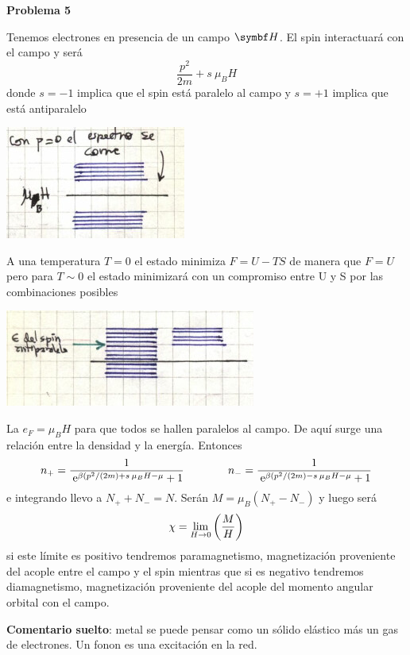 \documentclass[10pt,oneside]{CBFT_book}
\begin{document}
\begin{ejemplo}{\bf Problema 5}

Tenemos electrones en presencia de un campo $\vb{H}$. El spin interactuará con el campo y será
\[
	\frac{ p^2 }{ 2 m } + s \: \mu_B H
\]
donde $s=-1$ implica que el spin está paralelo al campo y $s=+1$ implica que está antiparalelo

\includegraphics[scale=0.5]{images/1606329613.jpg}

A una temperatura $T=0$ el estado minimiza $F=U-TS$ de manera que $F=U$ pero para $T\sim 0$ el 
estado minimizará con un compromiso entre U y S por las combinaciones posibles

\includegraphics[scale=0.5]{images/1606329617.jpg}

La $e_F = \mu_B H$ para que todos se hallen paralelos al campo. De aquí surge una relación entre
la densidad y la energía. Entonces
\[
	n_+ = \frac{ 1 }{ \:\mathrm{e}^{ \beta( p^2/(2m) + s \: \mu_B H - \mu } + 1 } \qquad \qquad 
	n_- = \frac{ 1 }{ \:\mathrm{e}^{ \beta( p^2/(2m) - s \: \mu_B H - \mu } + 1 }
\]
e integrando llevo a $N_+ + N_- = N$. Serán $M = \mu_B( N_+ - N_- ) $ y luego será
\[
	\chi = \lim_{H\to 0} \left( \frac{ M }{ H } \right)
\]
si este límite es positivo tendremos paramagnetismo, magnetización proveniente del acople entre
el campo y el spin mientras que si es negativo tendremos diamagnetismo, magnetización proveniente
del acople del momento angular orbital con el campo.

\end{ejemplo}

{\bf Comentario suelto}: metal se puede pensar como un sólido elástico más un gas de electrones. 
Un fonon es una excitación en la red.

\end{document}
